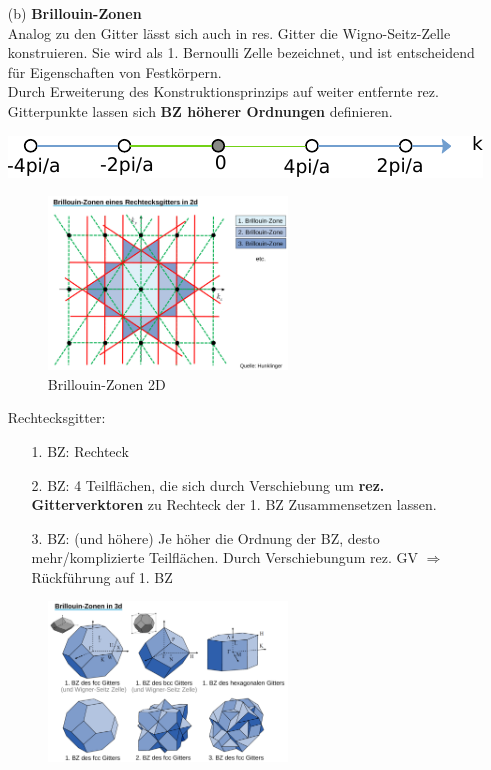 \begin{itemize}
    \item[(b)] \textbf{Brillouin-Zonen}\\
          Analog zu den Gitter lässt sich auch in res. Gitter die   Wigno-Seitz-Zelle konstruieren. Sie wird als 1. Bernoulli Zelle bezeichnet, und ist entscheidend für Eigenschaften von Festkörpern.\\
          Durch Erweiterung des Konstruktionsprinzips auf weiter entfernte rez. Gitterpunkte lassen sich \textbf{BZ höherer Ordnungen} definieren.
          \begin{center}
              \includegraphics{figures/3_2_1D.pdf}
          \end{center}
          \begin{figure}[H]
              \centering
              \includegraphics[width=0.6\textwidth]{figures/3_2_2D.png}
              \caption{Brillouin-Zonen 2D}
              \label{}
          \end{figure}
          Rechtecksgitter:
          \begin{itemize}
              \item[1. BZ:] Rechteck
              \item[2. BZ:] 4 Teilflächen, die sich durch Verschiebung um \textbf{rez. Gitterverktoren} zu Rechteck der 1. BZ Zusammensetzen lassen.
              \item[3. BZ:] (und höhere) Je höher die Ordnung der BZ, desto mehr/komplizierte Teilflächen. Durch Verschiebungum rez. GV $\Rightarrow$ Rückführung auf 1. BZ
          \end{itemize}
          \begin{figure}[H]
              \centering
              \includegraphics[width=0.6\textwidth]{figures/3_2_3D.png}

\end{figure}
\end{itemize}
